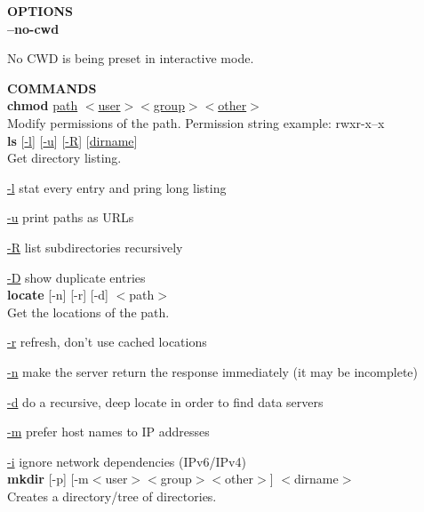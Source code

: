 \documentclass{article}
\begin{document}
		\noindent \textbf{OPTIONS} \\
		
		\noindent \textbf{--no-cwd}
		
        \noindent No CWD is being preset in interactive mode. \\
        
        \pagebreak
        
        \noindent \textbf{COMMANDS} \\
        
        \noindent \textbf{chmod} \underline{path} $<$\underline{user}$>$$<$\underline{group}$>$$<$\underline{other}$>$ \\
        \noindent Modify permissions of the path. Permission string example: rwxr-x--x \\

        \noindent \textbf{ls} [\underline{-l}] [\underline{-u}] [\underline{-R}] [\underline{dirname}] \\
        Get directory listing. 
        
        \underline{-l} stat every entry and pring long listing
        
        \underline{-u} print paths as URLs
        
        \underline{-R} list subdirectories recursively
         
        \underline{-D} show duplicate entries \\ 

        \noindent \textbf{locate} [-n] [-r] [-d] $<$path$>$ \\
        Get the locations of the path.
        
        \underline{-r} refresh, don't use cached locations
          
        \underline{-n} make the server return the response immediately (it may be incomplete)
          
        \underline{-d} do a recursive, deep locate in order to find data servers
          
        \underline{-m} prefer host names to IP addresses
          
        \underline{-i} ignore network dependencies (IPv6/IPv4) \\

        \noindent \textbf{mkdir} [-p] [-m$<$user$>$$<$group$>$$<$other$>$] $<$dirname$>$ \\
        Creates a directory/tree of directories.
        
\end{document}
